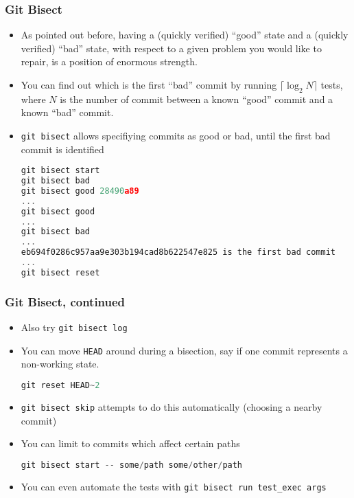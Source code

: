 \documentclass{beamer}
\begin{document}
\begin{frame}[fragile]
\frametitle{Git Bisect}
\begin{itemize}
\item As pointed out before, having a (quickly verified) ``good'' state and a (quickly verified) ``bad'' state, with respect to a given problem you would like to repair, is a position of enormous strength.
\item You can find out which is the first ``bad'' commit by running $\lceil \log_2{N} \rceil$ tests, where $N$ is the number of commit between a known ``good'' commit and a known ``bad'' commit.
\item \lstinline{git bisect} allows specifiying commits as good or bad, until the first bad commit is identified
\begin{lstlisting}[language=C++,
basicstyle=\tiny\ttfamily]
git bisect start
git bisect bad
git bisect good 28490a89
...
git bisect good
...
git bisect bad
...
eb694f0286c957aa9e303b194cad8b622547e825 is the first bad commit
...
git bisect reset
\end{lstlisting}
\end{itemize}
\end{frame}

\begin{frame}[fragile]
\frametitle{Git Bisect, continued}
\begin{itemize}
\item Also try \lstinline{git bisect log}
\item You can move \lstinline{HEAD} around during a bisection, say if one commit represents a non-working state.
\begin{lstlisting}[language=C++]
git reset HEAD~2
\end{lstlisting}
\item \lstinline{git bisect skip} attempts to do this automatically (choosing a nearby commit)
\item You can limit to commits which affect certain paths
\begin{lstlisting}[language=C++]
git bisect start -- some/path some/other/path
\end{lstlisting}
\item You can even automate the tests with \lstinline{git bisect run test_exec args}
\end{itemize}
\end{frame}
\end{document}
